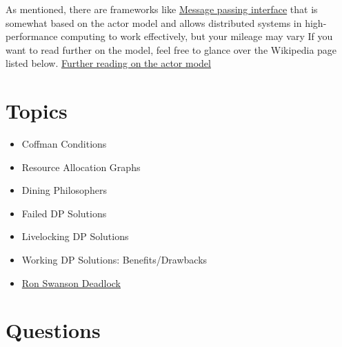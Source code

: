 As mentioned, there are frameworks like \href{https://en.wikipedia.org/wiki/Message\_Passing\_Interface}{Message passing interface} that is somewhat based on the actor model and allows distributed systems in high-performance computing to work effectively, but your mileage may vary
If you want to read further on the model, feel free to glance over the Wikipedia page listed below.
\href{https://en.wikipedia.org/wiki/Actor\_model}{Further reading on the actor model}

\section{Topics}

\begin{itemize}
	\item Coffman Conditions
	\item Resource Allocation Graphs
	\item Dining Philosophers
	\item Failed DP Solutions
	\item Livelocking DP Solutions
	\item Working DP Solutions: Benefits/Drawbacks
	\item \href{http://adit.io/posts/2013-05-11-The-Dining-Philosophers-Problem-With-Ron-Swanson.html}{Ron Swanson Deadlock}
\end{itemize}

\section{Questions}

